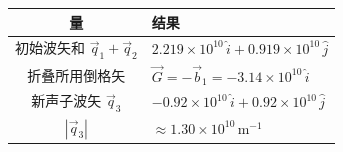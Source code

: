 \begin{formulabox}[答案汇总]
\begin{center}
\begin{tabular}{cl}
\toprule
量 & 结果 \\
\midrule
初始波矢和 $\vec q_1+\vec q_2$ & $2.219\times10^{10}\,\hat i + 0.919\times10^{10}\,\hat j$ \\[8pt]
折叠所用倒格矢 & $\vec G=-\vec b_1=-3.14\times10^{10}\,\hat i$ \\[8pt]
新声子波矢 $\vec q_3$ & $-0.92\times10^{10}\,\hat i + 0.92\times10^{10}\,\hat j$ \\[8pt]
$|\vec q_3|$ & $\approx1.30\times10^{10}\,\mathrm{m^{-1}}$ \\
\bottomrule
\end{tabular}
\end{center}
\end{formulabox}

